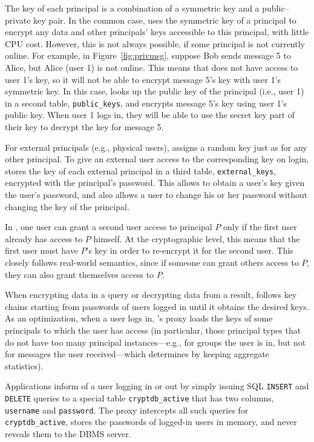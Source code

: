 The key of each principal is  a combination of a symmetric key
and a public--private key pair.  In the common case, \name uses the
symmetric key of a principal to encrypt any data and other principals'
keys accessible to this principal, with little CPU cost.  However, this is not always
possible, if some principal is not currently online.  For example,
in Figure~\ref{fig:privmsg}, suppose Bob sends message 5 to Alice, but
Alice (user 1) is not online.  This means that \name does not have access
to user 1's key, so it will not be able to encrypt message 5's key with
user 1's symmetric key.  In this case, \name looks up the public key
of the principal (i.e., user 1) in a second table, \texttt{public\_keys}, and encrypts
message 5's key using user 1's public key.  When user 1 logs in, they
will be able to use the secret key part of their key to decrypt the
key for message 5.

For external principals (e.g., physical users), \name assigns a
random key just as for any other principal.  To give an external user
access to the corresponding key on login, \name stores the key of each
external principal in a third table, \texttt{external\_keys}, encrypted
with the principal's password.  This allows \name to obtain a user's
key given the user's password, and also allows a user to change his or
her password without changing the key of the principal.

In \name{}, one user can grant a second user access to principal $P$
only if the first user already has access to $P$ himself.  At the
cryptographic level, this means that the first user must have $P$'s
key in order to re-encrypt it for the second user.  This closely
follows real-world semantics, since if someone can grant others
access to $P$, they can also grant themselves access to $P$.

When encrypting data in a query or decrypting data from a result,
\name{} follows key chains starting from passwords of users logged in
until it obtains the desired keys. As an optimization, when a user
logs in, \name{}'s proxy loads the keys of some principals to which
the user has access (in particular, those principal types that do not
have too many principal instances---e.g., for groups the user is in,
but not for messages the user received---which \name determines by
keeping aggregate statistics).

Applications inform \name{} of a user logging in or out by simply
issuing SQL {\tt INSERT} and {\tt DELETE} queries to a special
table \texttt{cryptdb\_active} that has two columns, {\tt username}
and {\tt password}.  The proxy intercepts all such queries for
\texttt{cryptdb\_active}, stores the passwords of logged-in users in
memory, and never reveals them to the DBMS server.

